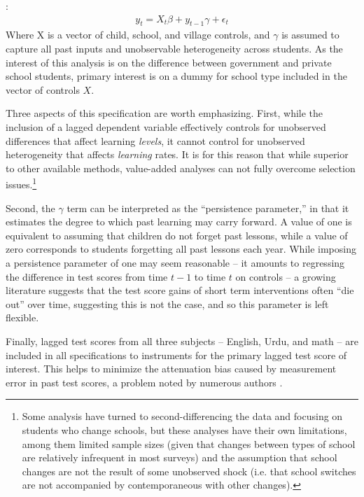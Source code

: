 \documentclass[12pt]{article}
\begin{document}
:
\begin{eqnarray*}
	y_{t}=X_t\beta+y_{t-1}\gamma + \epsilon_t
\end{eqnarray*}
Where X is a vector of child, school, and village controls, and $\gamma$ is assumed to capture all past inputs and unobservable heterogeneity across students. As the interest of this analysis is on the difference between government and private school students, primary interest is on a dummy for school type included in the vector of controls $X$. 

Three aspects of this specification are worth emphasizing. First, while the inclusion of a lagged dependent variable effectively controls for unobserved differences that affect learning \emph{levels}, it cannot control for unobserved heterogeneity that affects \emph{learning} rates. It is for this reason that while superior to other available methods, value-added analyses can not fully overcome selection issues.\footnote{Some analysis have turned to second-differencing the data and focusing on students who change schools, but these analyses have their own limitations, among them limited sample sizes (given that changes between types of school are relatively infrequent in most surveys) and the assumption that school changes are not the result of some unobserved shock (i.e. that school switches are not accompanied by contemporaneous with other changes).}

Second, the $\gamma$ term can be interpreted as the ``persistence parameter,'' in that it estimates the degree to which past learning may carry forward. A value of one is equivalent to assuming that children do not forget past lessons, while a value of zero corresponds to students forgetting all past lessons each year. While imposing a persistence parameter of one may seem reasonable -- it amounts to regressing the difference in test scores from time $t-1$ to time $t$ on controls -- a growing literature suggests that the test score gains of short term interventions often ``die out'' over time, suggesting this is not the case\citep{Banerjee:2007wx, Glewwe:2010hj,Currie:1995wo,Andrabi:2011hl, Rothstein:2010bk}, and so this parameter is left flexible. 

Finally, lagged test scores from all three subjects -- English, Urdu, and math -- are included in all specifications to instruments for the primary lagged test score of interest. This helps to minimize the attenuation bias caused by measurement error in past test scores, a problem noted by numerous authors \citep{Kane:2002if,Chay:2005wu,Andrabi:2011hl}. 
\end{document}
